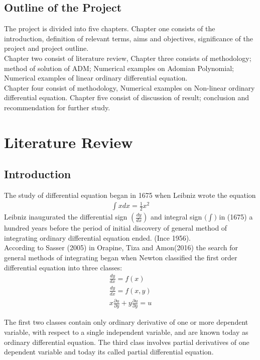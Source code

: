 \documentclass[11pt]{report}
\newcommand{\sps}{\\[0.2cm]}
\newcommand{\dsp}{\displaystyle}
\newcommand{\NI}{\noindent}
\begin{document}
	\section{Outline of the Project}
	The project is divided into five chapters. Chapter one consists of the introduction, definition of relevant terms, aims and objectives, significance of the project and project outline.\\
	
	\NI Chapter two consist of literature review, Chapter three consists of methodology; method of solution of ADM; Numerical examples on Adomian Polynomial; Numerical examples of linear ordinary differential equation.\\
	
	\NI Chapter four consist of methodology, Numerical examples on Non-linear ordinary differential equation. Chapter five consist of discussion of result; conclusion and recommendation for further study.
	

	
	\chapter{Literature Review}
	\section{Introduction}
	The study of differential equation began in 1675 when Leibniz wrote the equation
	\begin{eqnarray}
		\int x dx = \frac{1}{2}x^2
	\end{eqnarray}
	Leibniz inaugurated the differential sign $\dsp\left(\frac{dy}{dx}\right)$ and integral sign $\dsp\Big(\int\Big)$ in (1675) a hundred years before the period of initial discovery of general method of integrating ordinary differential equation ended. (Ince 1956).\\
	
	\NI According to Sasser (2005) in Orapine, Tiza and Amon(2016) the search for general methods of integrating began when Newton classified the first order differential equation into three classes:
	\begin{gather}
		\frac{dy}{dx} = f(x)\sps
		\frac{dy}{dx} = f(x,y)\sps
		x\frac{\partial u}{\partial y}+ y\frac{\partial u}{\partial y} = u
	\end{gather}
	
	\NI The first two classes contain only ordinary derivative of one or more dependent variable, with respect to a single independent variable, and are known today as ordinary differential equation. The third class involves partial derivatives of one dependent variable and today its called partial differential equation.\\
	
\end{document}
